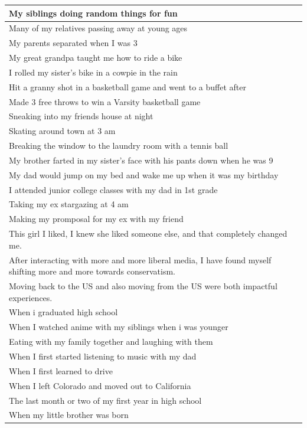 \documentclass[
  .7em,
  letterpaper,
  DIV=11,
  numbers=noendperiod]{scrartcl}
\begin{document}
\begin{table}
\begin{tabular}{l}
\hline
My siblings doing random things for fun\\
\hline
Many of my relatives passing away at young ages\\
\hline
My parents separated when I was 3\\
\hline
My great grandpa taught me how to ride a bike\\
\hline
I rolled my sister's bike in a cowpie in the rain\\
\hline
Hit a granny shot in a basketball game and went to a buffet after\\
\hline
Made 3 free throws to win a Varsity basketball game\\
\hline
Sneaking into my friends house at night\\
\hline
Skating around town at 3 am\\
\hline
Breaking the window to the laundry room with a tennis ball\\
\hline
My brother farted in my sister's face with his pants down when he was 9\\
\hline
My dad would jump on my bed and wake me up when it was my birthday\\
\hline
I attended junior college classes with my dad in 1st grade\\
\hline
Taking my ex stargazing at 4 am\\
\hline
Making my promposal for my ex with my friend\\
\hline
This girl I liked, I knew she liked someone else, and that completely changed me.\\
\hline
After interacting with more and more liberal media, I have found myself shifting more and more towards conservatism.\\
\hline
Moving back to the US and also moving from the US were both impactful experiences.\\
\hline
When i graduated high school\\
\hline
When I watched anime with my siblings when i was younger\\
\hline
Eating with my family together and laughing with them\\
\hline
When I first started listening to music with my dad\\
\hline
When I first learned to drive\\
\hline
When I left Colorado and moved out to California\\
\hline
The last month or two of my first year in high school\\
\hline
When my little brother was born\\

\end{tabular}
\end{table}
\end{document}
